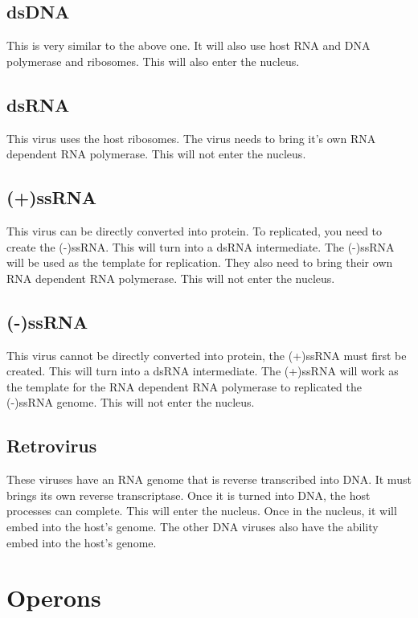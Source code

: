 \documentclass{article}
\begin{document}
\subsection{dsDNA}

This is very similar to the above one. It will also use host RNA and DNA
polymerase and ribosomes. This will also enter the nucleus.

\subsection{dsRNA}

This virus uses the host ribosomes. The virus needs to bring it's own RNA
dependent RNA polymerase. This will not enter the nucleus.

\subsection{(+)ssRNA}

This virus can be directly converted into protein. To replicated, you need to
create the (-)ssRNA. This will turn into a dsRNA intermediate. The (-)ssRNA will
be used as the template for replication. They also need to bring their own RNA
dependent RNA polymerase. This will not enter the nucleus.

\subsection{(-)ssRNA}

This virus cannot be directly converted into protein, the (+)ssRNA must first be
created. This will turn into a dsRNA intermediate. The (+)ssRNA will work as the
template for the RNA dependent RNA polymerase to replicated the (-)ssRNA genome.
This will not enter the nucleus.

\subsection{Retrovirus}

These viruses have an RNA genome that is reverse transcribed into DNA. It must
brings its own reverse transcriptase. Once it is turned into DNA, the host
processes can complete. This will enter the nucleus. Once in the nucleus, it
will embed into the host's genome. The other DNA viruses also have the ability
embed into the host's genome.

\section{Operons}
\end{document}
